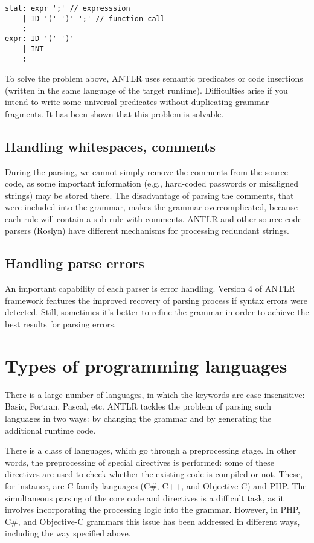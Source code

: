 \documentclass[a4paper, 10pt, conference]{ieeeconf}
\begin{document}
\begin{lstlisting}
stat: expr ';' // expresssion
    | ID '(' ')' ';' // function call
    ;
expr: ID '(' ')'
    | INT
    ;
\end{lstlisting}
    
To solve the problem above, ANTLR uses semantic predicates or code insertions (written in the same language of the target runtime). Difficulties arise if you intend to write some universal predicates without duplicating grammar fragments. It has been shown that this problem is solvable.

\subsection{Handling whitespaces, comments}

During the parsing, we cannot simply remove the comments from the source code, as some important information (e.g., hard-coded passwords or misaligned strings) may be stored there. The disadvantage of parsing the comments, that were included into the grammar, makes the grammar overcomplicated, because each rule will contain a sub-rule with comments. ANTLR and other source code parsers (Roslyn) have different mechanisms for processing redundant strings\cite{antlr-roslyn}.

\subsection{Handling parse errors}

An important capability of each parser is error handling. Version 4 of ANTLR framework features the improved recovery of parsing process if syntax errors were detected. Still, sometimes it’s better to refine the grammar in order to achieve the best results for parsing errors. 

\section{Types of programming languages}

There is a large number of languages, in which the keywords are case-insensitive: Basic, Fortran, Pascal, etc. ANTLR tackles the problem of parsing such languages in two ways: by changing the grammar and by generating the additional runtime code.

There is a class of languages, which go through a preprocessing stage. In other words, the preprocessing of special directives is performed: some of these directives are used to check whether the existing code is compiled or not. These, for instance, are C-family languages (C\#, C++, and Objective-C) and PHP. The simultaneous parsing of the core code and directives is a difficult task, as it involves incorporating the processing logic into the grammar. However, in PHP, C\#, and Objective-C grammars this issue has been addressed in different ways, including the way specified above.
\end{document}

